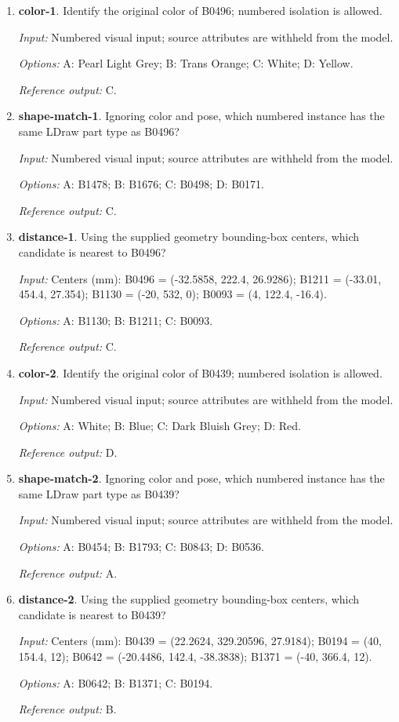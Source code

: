 \begin{enumerate}
\item \textbf{color-1}. Identify the original color of B0496; numbered isolation is allowed.\par {\small \textit{Input:} Numbered visual input; source attributes are withheld from the model. \par\textit{Options:} A: Pearl Light Grey; B: Trans Orange; C: White; D: Yellow. \par\textit{Reference output:} C.}
\item \textbf{shape-match-1}. Ignoring color and pose, which numbered instance has the same LDraw part type as B0496?\par {\small \textit{Input:} Numbered visual input; source attributes are withheld from the model. \par\textit{Options:} A: B1478; B: B1676; C: B0498; D: B0171. \par\textit{Reference output:} C.}
\item \textbf{distance-1}. Using the supplied geometry bounding-box centers, which candidate is nearest to B0496?\par {\small \textit{Input:} Centers (mm): B0496 = (-32.5858, 222.4, 26.9286); B1211 = (-33.01, 454.4, 27.354); B1130 = (-20, 532, 0); B0093 = (4, 122.4, -16.4). \par\textit{Options:} A: B1130; B: B1211; C: B0093. \par\textit{Reference output:} C.}
\item \textbf{color-2}. Identify the original color of B0439; numbered isolation is allowed.\par {\small \textit{Input:} Numbered visual input; source attributes are withheld from the model. \par\textit{Options:} A: White; B: Blue; C: Dark Bluish Grey; D: Red. \par\textit{Reference output:} D.}
\item \textbf{shape-match-2}. Ignoring color and pose, which numbered instance has the same LDraw part type as B0439?\par {\small \textit{Input:} Numbered visual input; source attributes are withheld from the model. \par\textit{Options:} A: B0454; B: B1793; C: B0843; D: B0536. \par\textit{Reference output:} A.}
\item \textbf{distance-2}. Using the supplied geometry bounding-box centers, which candidate is nearest to B0439?\par {\small \textit{Input:} Centers (mm): B0439 = (22.2624, 329.20596, 27.9184); B0194 = (40, 154.4, 12); B0642 = (-20.4486, 142.4, -38.3838); B1371 = (-40, 366.4, 12). \par\textit{Options:} A: B0642; B: B1371; C: B0194. \par\textit{Reference output:} B.}

\end{enumerate}
